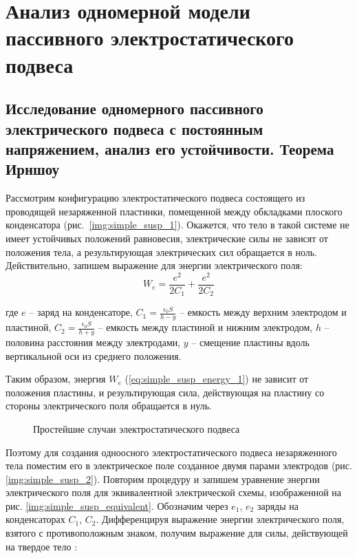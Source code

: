 \chapter{Анализ одномерной модели пассивного электростатического подвеса} \label{chapt2}

\section{Исследование одномерного пассивного электрического подвеса с постоянным напряжением, анализ его устойчивости. Теорема Ирншоу} \label{sect2_1}

Рассмотрим конфигурацию электростатического подвеса состоящего из проводящей незаряженной пластинки, помещенной между обкладками плоского конденсатора (рис.~\ref{img:simple_susp_1}). Окажется, что тело в такой системе не имеет устойчивых положений равновесия, электрические силы не зависят от положения тела, а результирующая электрических сил обращается в ноль. Действительно, запишем выражение для энергии электрического поля:
\begin{equation}
  \label{eq:simple_susp_energy_1}
  W_e = \frac{e^2}{2C_1}+\frac{e^2}{2C_2}
\end{equation}

\noindent где $e$ – заряд на конденсаторе, $C_1 = \frac{\epsilon_0 S}{h-y}$ – емкость между верхним электродом и пластиной, $C_2 = \frac{\epsilon_0 S}{h+y}$ – емкость между пластиной и нижним электродом, $h$ – половина расстояния между электродами, $y$ – смещение пластины вдоль вертикальной оси из среднего положения.

Таким образом, энергия $W_e$ (\ref{eq:simple_susp_energy_1}) не зависит от положения пластины, и результирующая сила, действующая на пластину со стороны электрического поля обращается в нуль.

\begin{figure}[ht]
    {\centering
        \hfill
        \hfill
        \hfill
    }
    \caption{Простейшие случаи электростатического подвеса}
    \label{img:simple_susp}
\end{figure}


Поэтому для создания одноосного электростатического подвеса незаряженного тела поместим его в электрическое поле созданное двумя парами электродов (рис. \ref{img:simple_susp_2}). Повторим процедуру и запишем уравнение энергии электрического поля для эквивалентной электрической схемы, изображенной на рис. \ref{img:simple_susp_equivalent}. Обозначим через $e_1$, $e_2$ заряды на конденсаторах $C_1$, $C_2$. Дифференцируя выражение энергии электрического поля, взятого с противоположным знаком, получим выражение для силы, действующей на твердое тело \cite{Martynenko}:

